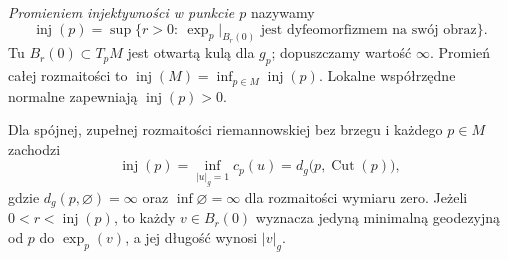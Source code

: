 \begin{definicja}
\label{def:promien-injektywnosci}
\emph{Promieniem injektywności w punkcie $p$} nazywamy
\[
 \operatorname{inj}(p)=
 \sup\{r>0:\ \exp_p|_{B_r(0)}
       \text{ jest dyfeomorfizmem na swój obraz}\}.
\]
Tu $B_r(0)\subset T_pM$ jest otwartą kulą dla $g_p$;
dopuszczamy wartość $\infty$. Promień całej rozmaitości
to $\operatorname{inj}(M)=\inf_{p\in M}\operatorname{inj}(p)$.
Lokalne współrzędne normalne zapewniają
$\operatorname{inj}(p)>0$.
\end{definicja}

\begin{twierdzenie}
\label{thm:ciecie-promien-injektywnosci}
Dla spójnej, zupełnej rozmaitości riemannowskiej bez brzegu
i każdego $p\in M$ zachodzi
\begin{equation}\label{eq:inj-inf-ciecie}
 \operatorname{inj}(p)
 =\inf_{|u|_g=1}c_p(u)
 =d_g\bigl(p,\operatorname{Cut}(p)\bigr),
\end{equation}
 gdzie $d_g(p,\varnothing)=\infty$ oraz
 $\inf\varnothing=\infty$ dla rozmaitości wymiaru zero.
Jeżeli $0<r<\operatorname{inj}(p)$, to każdy
$v\in B_r(0)$ wyznacza jedyną minimalną geodezyjną
od $p$ do $\exp_p(v)$, a jej długość wynosi $|v|_g$.
\end{twierdzenie}
